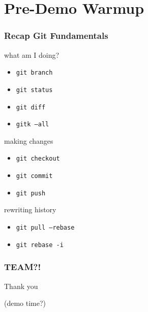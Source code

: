 \documentclass{beamer}
\begin{document}
\section{Pre-Demo Warmup}


\begin{frame}
\frametitle{Recap Git Fundamentals}
\begin{block}{what am I doing?}
    \begin{itemize}
        \item \texttt{git branch}
        \item \texttt{git status}
        \item \texttt{git diff}
        \item \texttt{gitk --all}
    \end{itemize}
\end{block}

\begin{block}{making changes}
    \begin{itemize}
        \item \texttt{git checkout}
        \item \texttt{git commit}
        \item \texttt{git push}
    \end{itemize}
\end{block}

\begin{block}{rewriting history}
    \begin{itemize}
        \item \texttt{git pull --rebase}
        \item \texttt{git rebase -i}
    \end{itemize}
\end{block}

\end{frame}

\begin{frame}
\frametitle{TEAM?!}
\begin{center}
    {\Huge Thank you}

    (demo time?)
\end{center} 
\end{frame}
\end{document}
